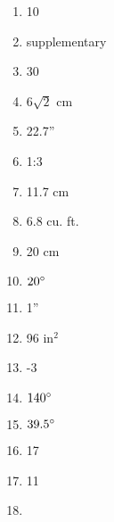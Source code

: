 \documentclass[../uilmath.tex]{subfiles}
\begin{document}
\begin{enumerate}[label=\bfseries\arabic*.]
    \item %
    10

    \item %
    supplementary

    \item %
    30

    \item %
    $6\sqrt{2}$ cm 

    \item %
    22.7''

    \item %
    1:3

    \item %
    11.7 cm 

    \item %
    6.8 cu. ft. 

    \item %
    20 cm

    \item %
    $20\degree$

    \item %
    1''

    \item %
    96 in$^2$

    \item %
    -3

    \item %
    $140\degree$

    \item %
    $39.5\degree$

    \item %
    17

    \item %
    11

    \item %
    
\end{enumerate}
\end{document}
